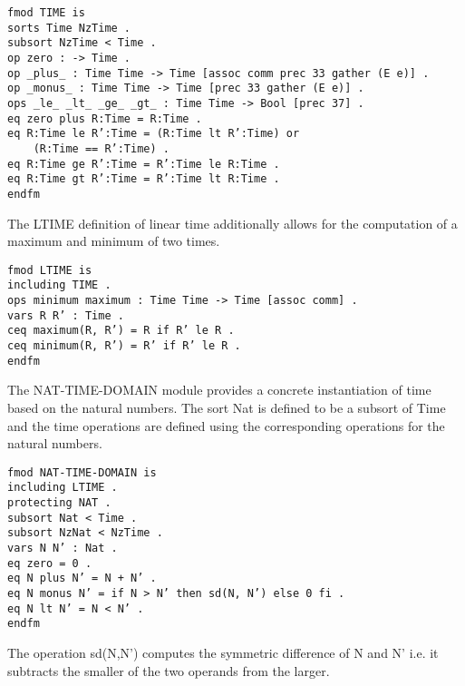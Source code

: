 \begin{lstlisting}[caption = "The TIME specification in Real Time Maude"]
fmod TIME is
sorts Time NzTime .
subsort NzTime < Time .
op zero : -> Time .
op _plus_ : Time Time -> Time [assoc comm prec 33 gather (E e)] .
op _monus_ : Time Time -> Time [prec 33 gather (E e)] .
ops _le_ _lt_ _ge_ _gt_ : Time Time -> Bool [prec 37] .
eq zero plus R:Time = R:Time .
eq R:Time le R’:Time = (R:Time lt R’:Time) or 
	(R:Time == R’:Time) .
eq R:Time ge R’:Time = R’:Time le R:Time .
eq R:Time gt R’:Time = R’:Time lt R:Time .
endfm
\end{lstlisting}
The  LTIME definition of linear time additionally allows for the computation of a maximum and minimum of two times.
\begin{lstlisting}[caption = "The LTIME specification in Real Time Maude"]
fmod LTIME is
including TIME .
ops minimum maximum : Time Time -> Time [assoc comm] .
vars R R’ : Time .
ceq maximum(R, R’) = R if R’ le R .
ceq minimum(R, R’) = R’ if R’ le R .
endfm
\end{lstlisting}
 
The NAT-TIME-DOMAIN module provides a concrete instantiation of time based on the natural numbers. The sort Nat is defined to be a subsort of Time and the time operations are defined using the corresponding operations for the natural numbers.

\begin{lstlisting}[caption = "The Natural Number Time Domain in Real Time Maude "]
fmod NAT-TIME-DOMAIN is
including LTIME .
protecting NAT .
subsort Nat < Time .
subsort NzNat < NzTime .
vars N N’ : Nat .
eq zero = 0 .
eq N plus N’ = N + N’ .
eq N monus N’ = if N > N’ then sd(N, N’) else 0 fi .
eq N lt N’ = N < N’ .
endfm
\end{lstlisting}

The operation sd(N,N') computes the symmetric difference of N and N' i.e. it subtracts the smaller of the two operands from the larger.

